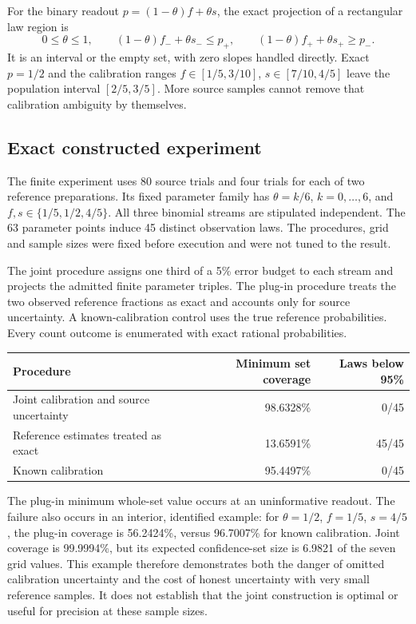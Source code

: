 \documentclass[11pt,a4paper]{article}
\begin{document}
For the binary readout $p=(1-\theta)f+\theta s$, the exact projection of a rectangular law region is
\[
0\le\theta\le1,\qquad
(1-\theta)f_-+\theta s_-\le p_+,\qquad
(1-\theta)f_++\theta s_+\ge p_-.
\]
It is an interval or the empty set, with zero slopes handled directly. Exact $p=1/2$ and the calibration ranges $f\in[1/5,3/10]$, $s\in[7/10,4/5]$ leave the population interval $[2/5,3/5]$. More source samples cannot remove that calibration ambiguity by themselves.

\subsection{Exact constructed experiment}
The finite experiment uses 80 source trials and four trials for each of two reference preparations. Its fixed parameter family has $\theta=k/6$, $k=0,\ldots,6$, and $f,s\in\{1/5,1/2,4/5\}$. All three binomial streams are stipulated independent. The 63 parameter points induce 45 distinct observation laws. The procedures, grid and sample sizes were fixed before execution and were not tuned to the result.

The joint procedure assigns one third of a 5\% error budget to each stream and projects the admitted finite parameter triples. The plug-in procedure treats the two observed reference fractions as exact and accounts only for source uncertainty. A known-calibration control uses the true reference probabilities. Every count outcome is enumerated with exact rational probabilities.

\begin{center}\small
\begin{tabular}{p{73mm}rr}\toprule
Procedure & Minimum set coverage & Laws below 95\%\\\midrule
Joint calibration and source uncertainty & 98.6328\% & 0/45\\
Reference estimates treated as exact & 13.6591\% & 45/45\\
Known calibration & 95.4497\% & 0/45\\\bottomrule
\end{tabular}
\end{center}

The plug-in minimum whole-set value occurs at an uninformative readout. The failure also occurs in an interior, identified example: for $\theta=1/2$, $f=1/5$, $s=4/5$, the plug-in coverage is 56.2424\%, versus 96.7007\% for known calibration. Joint coverage is 99.9994\%, but its expected confidence-set size is 6.9821 of the seven grid values. This example therefore demonstrates both the danger of omitted calibration uncertainty and the cost of honest uncertainty with very small reference samples. It does not establish that the joint construction is optimal or useful for precision at these sample sizes.
\end{document}
